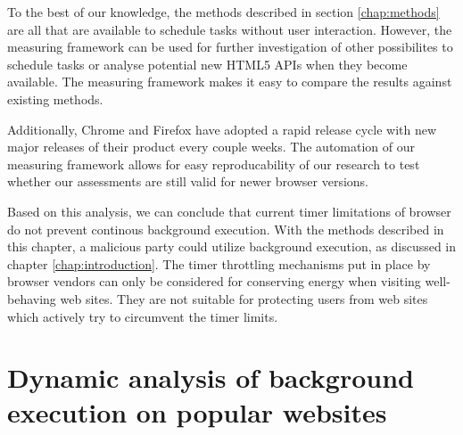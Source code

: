 \documentclass[
	ruledheaders=section,%
	class=report,%
	thesis={type=bachelor},%
	accentcolor=9c,%
	custommargins=true,%
	marginpar=false,%
	parskip=half-,%
	fontsize=11pt,%
]{tudapub}
\begin{document}
  To the best of our knowledge, the methods described in section \ref{chap:methods} are all that are available to schedule tasks without user interaction. However, the measuring framework can be used for further investigation of other possibilites to schedule tasks or analyse potential new HTML5 APIs when they become available. The measuring framework makes it easy to compare the results against existing methods.

  Additionally, Chrome and Firefox have adopted a rapid release cycle with new major releases of their product every couple weeks. The automation of our measuring framework allows for easy reproducability of our research to test whether our assessments are still valid for newer browser versions.

  Based on this analysis, we can conclude that current timer limitations of browser do not prevent continous background execution. With the methods described in this chapter, a malicious party could utilize background execution, as discussed in chapter \ref{chap:introduction}. The timer throttling mechanisms put in place by browser vendors can only be considered for conserving energy when visiting well-behaving web sites. They are not suitable for protecting users from web sites which actively try to circumvent the timer limits.

  \newpage
  \chapter{Dynamic analysis of background execution on popular websites}
  \label{chap:tracing}
\end{document}
